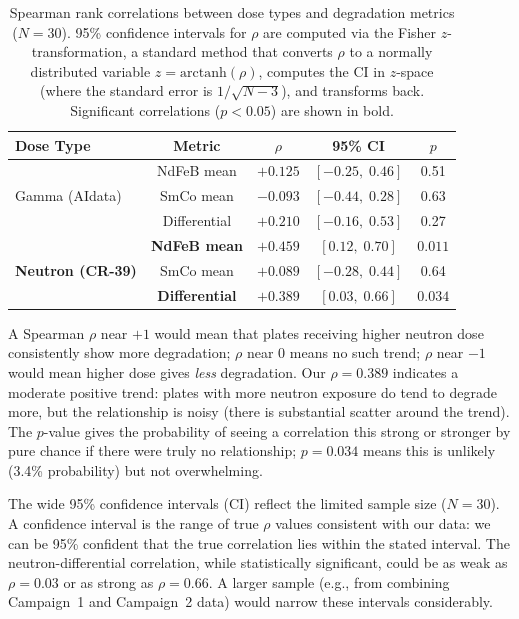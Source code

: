 \documentclass[11pt,letterpaper]{article}
\begin{document}
\begin{table}[H]
\centering
\caption{Spearman rank correlations between dose types and degradation metrics
($N = 30$). 95\% confidence intervals for $\rho$ are computed via the Fisher
$z$-transformation, a standard method that converts $\rho$ to a normally
distributed variable $z = \mathrm{arctanh}(\rho)$, computes the CI in
$z$-space (where the standard error is $1/\sqrt{N-3}$), and transforms back.
Significant correlations ($p < 0.05$) are shown in bold.}
\label{tab:correlations}
\begin{tabular}{@{}lcccc@{}}
\toprule
\textbf{Dose Type} & \textbf{Metric} & $\rho$ & \textbf{95\% CI} & $p$ \\
\midrule
\multirow{3}{*}{Gamma (AIdata)} & NdFeB mean & $+0.125$ & $[-0.25,\; 0.46]$ & 0.51 \\
 & SmCo mean & $-0.093$ & $[-0.44,\; 0.28]$ & 0.63 \\
 & Differential & $+0.210$ & $[-0.16,\; 0.53]$ & 0.27 \\
\midrule
\multirow{3}{*}{\textbf{Neutron (CR-39)}} & \textbf{NdFeB mean} & $\mathbf{+0.459}$ & $[0.12,\; 0.70]$ & $\mathbf{0.011}$ \\
 & SmCo mean & $+0.089$ & $[-0.28,\; 0.44]$ & 0.64 \\
 & \textbf{Differential} & $\mathbf{+0.389}$ & $[0.03,\; 0.66]$ & $\mathbf{0.034}$ \\
\bottomrule
\end{tabular}
\end{table}

A Spearman $\rho$ near $+1$ would mean that plates receiving higher neutron
dose consistently show more degradation; $\rho$ near $0$ means no such trend;
$\rho$ near $-1$ would mean higher dose gives \emph{less} degradation. Our
$\rho = 0.389$ indicates a moderate positive trend: plates with more neutron
exposure do tend to degrade more, but the relationship is noisy (there is
substantial scatter around the trend). The $p$-value gives the probability of
seeing a correlation this strong or stronger by pure chance if there were
truly no relationship; $p = 0.034$ means this is unlikely (3.4\% probability)
but not overwhelming.

The wide 95\% confidence intervals (CI) reflect the limited sample size
($N = 30$). A confidence interval is the range of true $\rho$ values
consistent with our data: we can be 95\% confident that the true correlation
lies within the stated interval. The neutron-differential correlation, while
statistically significant, could be as weak as $\rho = 0.03$ or as strong as
$\rho = 0.66$. A larger sample (e.g., from combining Campaign~1 and
Campaign~2 data) would narrow these intervals considerably.
\end{document}
